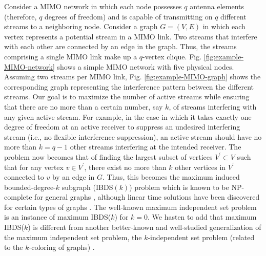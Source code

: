 \documentclass[journal,12pt,onecolumn]{IEEEtran}
\begin{document}
Consider a MIMO network in which each node possesses $q$ antenna
elements (therefore, $q$ degrees of freedom) and is capable of
transmitting on $q$ different streams to a neighboring node. Consider
a graph $G = (V,E)$ in which each vertex represents a potential stream
in a MIMO link. Two streams that interfere with each other are
connected by an edge in the graph. 
Thus, the streams comprising a single MIMO link
make up a $q$-vertex clique. 
Fig.\,\,\ref{fig:example-MIMO-network} shows
a simple MIMO network with five physical nodes. Assuming two streams
per MIMO link, Fig.\,\,\ref{fig:example-MIMO-graph} shows the
corresponding graph representing the interference pattern between the
different streams. 
Our goal is to maximize the number of active streams while ensuring that there are no more than
a certain number, say $k$, of streams interfering with any given
active stream. For example, in the case in which it takes exactly one degree of freedom at an
active receiver to suppress an undesired
interfering stream (i.e., no flexible interference suppression), an
active stream should have no more than $k=q-1$ other streams interfering
at the intended receiver. The problem now becomes 
that of finding the largest subset of vertices $V^\prime \subset
V$ such that for any vertex $v \in V^\prime$, there exist no more than
$k$ other vertices in $V^\prime$ connected to $v$ by an edge in
$G$. Thus, this becomes the maximum induced bounded-degree-$k$
subgraph (IBDS$(k)$) problem which is known to be NP-complete for general
graphs \cite{Tel1994}, although linear time solutions have been
discovered for certain types of graphs \cite{BodFlu1996}. 
The well-known maximum independent set problem is an instance of
maximum IBDS($k$) for $k=0$. We hasten to add that maximum IBDS($k$) is
different from another better-known and well-studied generalization of the maximum
independent set problem, the $k$-independent set problem (related to
the $k$-coloring of graphs) \cite{West2001}.  
\end{document}
